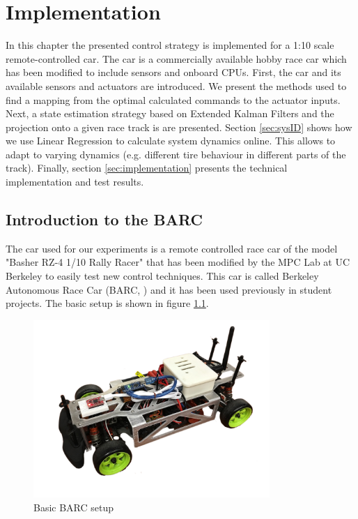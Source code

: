 \chapter{Implementation}
In this chapter the presented control strategy is implemented for a 1:10 scale remote-controlled car. The car is a commercially available hobby race car  which has been modified to include sensors and onboard CPUs. First, the car and its available sensors and actuators are introduced. We present the methods used to find a mapping from the optimal calculated commands to the actuator inputs. Next, a state estimation strategy based on Extended Kalman Filters and the projection onto a given race track is are presented. Section \ref{sec:sysID} shows how we use Linear Regression to calculate system dynamics online. This allows to adapt to varying dynamics (e.g. different tire behaviour in different parts of the track). Finally, section \ref{sec:implementation} presents the technical implementation and test results.\\

\section{Introduction to the BARC}
The car used for our experiments is a remote controlled race car of the model "Basher RZ-4 1/10 Rally Racer" that has been modified by the MPC Lab at UC Berkeley to easily test new control techniques. This car is called Berkeley Autonomous Race Car (BARC, \cite{BARC}) and it has been used previously in student projects. The basic setup is shown in figure \ref{fig:BARC}.
\begin{figure}[ht]
    \centering
  \includegraphics[width=0.8\textwidth]{../../Figures/BARC/IMG_1047.pdf}
    \caption{Basic BARC setup}
    \label{fig:BARC}
\end{figure}

